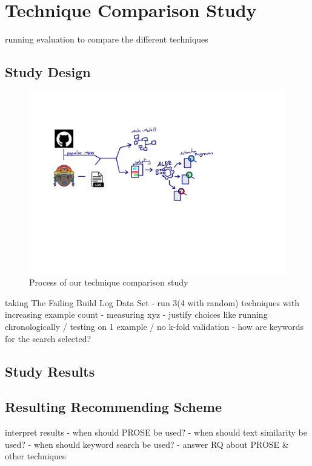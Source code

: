 \documentclass[\myrootdir/main.tex]{subfiles}
\begin{document}
\chapter{Technique Comparison Study}
\label{sec:study}
running evaluation to compare the different techniques

\section{Study Design}
\begin{figure}[h]
	\centering
	\includegraphics[page=6, width=\textwidth, trim={0.5cm 0.5cm 0.5cm 0.5cm}, clip]{img/flow-of-research.pdf}
	\caption{Process of our technique comparison study}
	\label{fig:study}
\end{figure}

taking The Failing Build Log Data Set - run 3(4 with random) techniques with increasing example count - measuring xyz - justify choices like running chronologically / testing on 1 example / no k-fold validation - how are keywords for the search selected?

\section{Study Results}

\section{Resulting Recommending Scheme}

interpret results - when should PROSE be used? - when should text similarity be used? - when should keyword search be used? - answer RQ about PROSE \& other techniques
\end{document}
